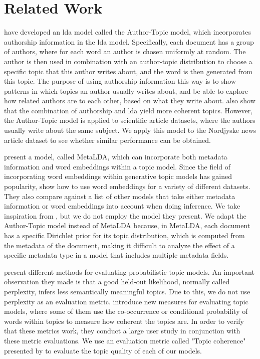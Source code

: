 \section{Related Work}\label{sec:related_work}

\citet{author_topic_2012} have developed an \gls{lda} model called the Author-Topic model, which incorporates authorship information in the \gls{lda} model.
Specifically, each document has a group of authors, where for each word an author is chosen uniformly at random.
The author is then used in combination with an author-topic distribution to choose a specific topic that this author writes about, and the word is then generated from this topic.
The purpose of using authorship information this way is to show patterns in which topics an author usually writes about, and be able to explore how related authors are to each other, based on what they write about.
\citeauthor{author_topic_2012} also show that the combination of authorship and \gls{lda} yield more coherent topics.
However, the Author-Topic model is applied to scientific article datasets, where the authors usually write about the same subject.
We apply this model to the Nordjyske news article dataset to see whether similar performance can be obtained.

\citet{MetaLDA2017} present a model, called MetaLDA, which can incorporate both metadata information and word embeddings within a topic model.
Since the field of incorporating word embeddings within generative topic models has gained popularity\cite{dieng2020topic}, \citet{MetaLDA2017} show how to use word embeddings for a variety of different datasets.
They also compare against a list of other models that take either metadata information or word embeddings into account when doing inference.
We take inspiration from \citet{MetaLDA2017}, but we do not employ the model they present. 
We adapt the Author-Topic model instead of MetaLDA because, in MetaLDA, each document has a specific Dirichlet prior for its topic distribution, which is computed from the metadata of the document, making it difficult to analyze the effect of a specific metadata type in a model that includes multiple metadata fields.

\citet{tea_leaves} present different methods for evaluating probabilistic topic models. 
An important observation they made is that a good held-out likelihood, normally called perplexity, infers less semantically meaningful topics.
Due to this, we do not use perplexity as an evaluation metric.
\citet{topic_coherence_2015} introduce new measures for evaluating topic models, where some of them use the co-occurrence or conditional probability of words within topics to measure how coherent the topics are. 
In order to verify that these metrics work, they conduct a large user study in conjunction with these metric evaluations.
We use an evaluation metric called "Topic coherence" presented by \citet{topic_coherence_2015} to evaluate the topic quality of each of our models.

